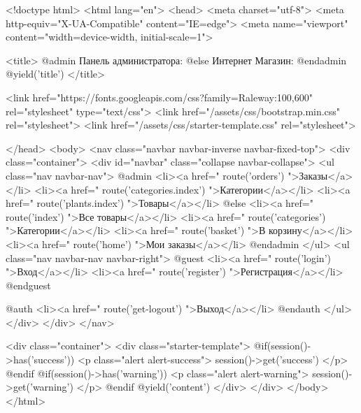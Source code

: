 <!doctype html>
<html lang="en">
<head>
	<meta charset="utf-8">
	<meta http-equiv="X-UA-Compatible" content="IE=edge">
	<meta name="viewport" content="width=device-width, initial-scale=1">
	
	<title>
		@admin Панель администратора:
		@else Интернет Магазин:
		@endadmin
		@yield('title')
	</title>
	
	<link href="https://fonts.googleapis.com/css?family=Raleway:100,600" rel="stylesheet" type="text/css">
	<link href="/assets/css/bootstrap.min.css" rel="stylesheet">
	<link href="/assets/css/starter-template.css" rel="stylesheet">

</head>
<body>
	<nav class="navbar navbar-inverse navbar-fixed-top">
		<div class="container">
			<div id="navbar" class="collapse navbar-collapse">
				<ul class="nav navbar-nav">
					@admin
						<li><a href="{{ route('orders') }}">Заказы</a></li>
						<li><a href="{{ route('categories.index') }}">Категории</a></li>
						<li><a href="{{ route('plants.index') }}">Товары</a></li>
					@else
						<li><a href="{{ route('index') }}">Все товары</a></li>
						<li><a href="{{ route('categories') }}">Категории</a></li>
						<li><a href="{{ route('basket') }}">В корзину</a></li>
						<li><a href="{{ route('home') }}">Мои заказы</a></li>
					@endadmin
				</ul>
				<ul class="nav navbar-nav navbar-right">
					@guest
						<li><a href="{{ route('login') }}">Вход</a></li>
						<li><a href="{{ route('register') }}">Регистрация</a></li>
					@endguest
					
					@auth
						<li><a href="{{ route('get-logout') }}">Выход</a></li>
					@endauth
				</ul>
			</div>
		</div>
	</nav>
			
	<div class="container">
		<div class="starter-template">
			@if(session()->has('success'))
				<p class="alert alert-success">{{ session()->get('success') }}</p>
			@endif
			@if(session()->has('warning'))
				<p class="alert alert-warning">{{ session()->get('warning') }}</p>
			@endif
			@yield('content')
		</div>
	</div>
</body>
</html>
